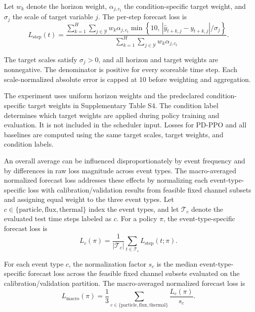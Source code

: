 Let $w_k$ denote the horizon weight, $\alpha_{j,c_t}$ the condition-specific
target weight, and $\sigma_j$ the scale of target variable $j$. The per-step
forecast loss is
\begin{equation}
  L_{\text{step}}(t)
  =
  \frac{
  \sum_{k=1}^{H}\sum_{j \in \mathcal{Y}}
  w_k \alpha_{j,c_t}
  \min\!\left\{10,\,
  \left| \hat{y}_{t+k,j} - y_{t+k,j} \right|/\sigma_j\right\}
  }{
  \sum_{k=1}^{H}\sum_{j \in \mathcal{Y}}
  w_k \alpha_{j,c_t}
  } .
  \label{eq:step_forecast_loss}
\end{equation}

The target scales satisfy $\sigma_j>0$, and all horizon and target weights are
nonnegative. The denominator is positive for every scoreable time step. Each
scale-normalized absolute error is capped at 10 before weighting and aggregation.

The experiment uses uniform horizon weights and the predeclared
condition-specific target weights in Supplementary Table S4. The condition
label determines which target weights are applied during policy training and
evaluation. It is not included in the scheduler input. Losses for PD-PPO and
all baselines are computed using the same target scales, target weights, and
condition labels.

An overall average can be influenced disproportionately by event frequency and
by differences in raw loss magnitude across event types. The macro-averaged normalized
forecast loss addresses these effects by normalizing each event-type-specific
loss with calibration/validation results from feasible fixed channel subsets and assigning
equal weight to the three event types. Let
$c\in\{\mathrm{particle},\mathrm{flux},\mathrm{thermal}\}$ index the event
types, and let $\mathcal{T}_c$ denote the evaluated test time steps labeled as
$c$. For a policy $\pi$, the event-type-specific forecast loss is
\begin{equation}
  L_c(\pi)
  =
  \frac{1}{|\mathcal{T}_c|}
  \sum_{t\in\mathcal{T}_c}
  L_{\text{step}}(t;\pi).
\end{equation}

For each event type $c$, the normalization factor $s_c$ is the median
event-type-specific forecast loss across the feasible fixed channel subsets
evaluated on the calibration/validation partition. The macro-averaged normalized forecast
loss is
\begin{equation}
  L_{\text{macro}}(\pi)
  =
  \frac{1}{3}
  \sum_{c\in\{\mathrm{particle},\mathrm{flux},\mathrm{thermal}\}}
  \frac{L_c(\pi)}{s_c}.
  \label{eq:macro_loss}
\end{equation}

